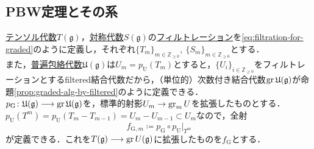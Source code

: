 \documentclass[rep_main]{subfiles}
\begin{document}
\subsection{PBW定理とその系}
\hyperref[def:tensor-alg]{テンソル代数}$T(\mathfrak{g})$，\hyperref[def:sym-alg]{対称代数}$S(\mathfrak{g})$の\hyperref[def:filtration]{フィルトレーション}を\eqref{eq:filtration-for-graded}のように定義し，それぞれ$\{T_m\}_{m \in \mathbb{Z}_{\geq 0}},\ \{S_m\}_{m \in \mathbb{Z}_{\geq 0}}$とする．\\
また，\hyperref[def:univ-env-alg]{普遍包絡代数}$\mathfrak{U}(\mathfrak{g})$は$U_m = p_\text{U}(T_m)$とすると，$\{U_i\}_{i \in \mathbb{Z}_{\geq 0}}$をフィルトレーションとするfiltered結合代数だから，（単位的）次数付き結合代数$\operatorname{gr} \mathfrak{U}(\mathfrak{g})$が命題\ref{prop:graded-alg-by-filtered}のように定義できる．\\
$p_\text{G}\colon \mathfrak{U}(\mathfrak{g}) \longrightarrow \operatorname{gr}\mathfrak{U}(\mathfrak{g})$を，標準的射影$U_m \to \operatorname{gr}_m U$を拡張したものとする．$p_\text{U}(T^m) = p_\text{U}(T_m - T_{m-1}) = U_m - U_{m-1} \subset U_m$なので，全射
\begin{equation}
	f_{\text{G}, m} \coloneqq p_\text{G}\circ p_\text{U}|_{T^m}
\end{equation}
が定義できる．これを$T(\mathfrak{g}) \longrightarrow \operatorname{gr} U(\mathfrak{g})$に拡張したものを$f_\text{G}$とする．
\end{document}
